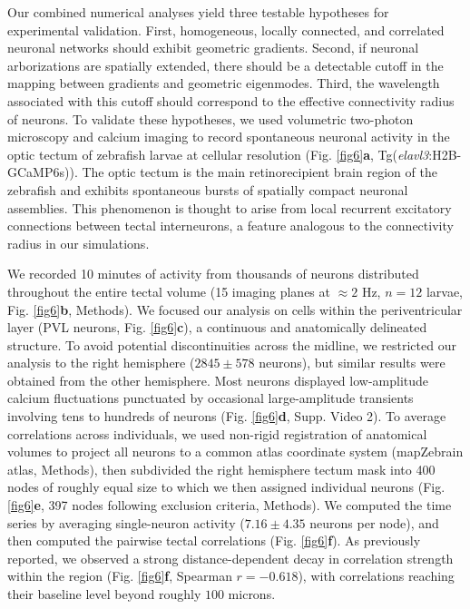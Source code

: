 \documentclass{article}
\begin{document}
Our combined numerical analyses yield three testable hypotheses for experimental validation. First, homogeneous, locally connected, and correlated neuronal networks should exhibit geometric gradients. Second, if neuronal arborizations are spatially extended, there should be a detectable cutoff in the mapping between gradients and geometric eigenmodes. Third, the wavelength associated with this cutoff should correspond to the effective connectivity radius of neurons. To validate these hypotheses, we used volumetric two-photon microscopy and calcium imaging to record spontaneous neuronal activity in the optic tectum of zebrafish larvae at cellular resolution (Fig. \ref{fig6}\textbf{a}, Tg(\textit{elavl3}:H2B-GCaMP6s)\cite{vladimirov2014light}). The optic tectum is the main retinorecipient brain region of the zebrafish\cite{baier2024visual} and exhibits spontaneous bursts of spatially compact neuronal assemblies\cite{avitan2017spontaneous, marachlian2018principles}. This phenomenon is thought to arise from local recurrent excitatory connections between tectal interneurons\cite{zylbertal2023recurrent}, a feature analogous to the connectivity radius in our simulations.

We recorded 10 minutes of activity from thousands of neurons distributed throughout the entire tectal volume (15 imaging planes at $\approx2$ Hz, $n=12$ larvae, Fig. \ref{fig6}\textbf{b}, Methods). We focused our analysis on cells within the periventricular layer (PVL neurons, Fig. \ref{fig6}\textbf{c}), a continuous and anatomically delineated structure. To avoid potential discontinuities across the midline, we restricted our analysis to the right hemisphere ($2845\pm578$ neurons), but similar results were obtained from the other hemisphere. Most neurons displayed low-amplitude calcium fluctuations punctuated by occasional large-amplitude transients involving tens to hundreds of neurons (Fig. \ref{fig6}\textbf{d}, Supp. Video 2). To average correlations across individuals, we used non-rigid registration of anatomical volumes\cite{avants2009advanced} to project all neurons to a common atlas coordinate system (mapZebrain atlas\cite{kunst2019cellular}, Methods), then subdivided the right hemisphere tectum mask into 400 nodes of roughly equal size to which we then assigned individual neurons (Fig. \ref{fig6}\textbf{e}, 397 nodes following exclusion criteria, Methods). We computed the time series by averaging single-neuron activity ($7.16\pm4.35$ neurons per node), and then computed the pairwise tectal correlations (Fig. \ref{fig6}\textbf{f}). As previously reported\cite{zylbertal2023recurrent}, we observed a strong distance-dependent decay in correlation strength within the region (Fig. \ref{fig6}\textbf{f}, Spearman $r=-0.618$), with correlations reaching their baseline level beyond roughly $100$ microns. 
\end{document}
